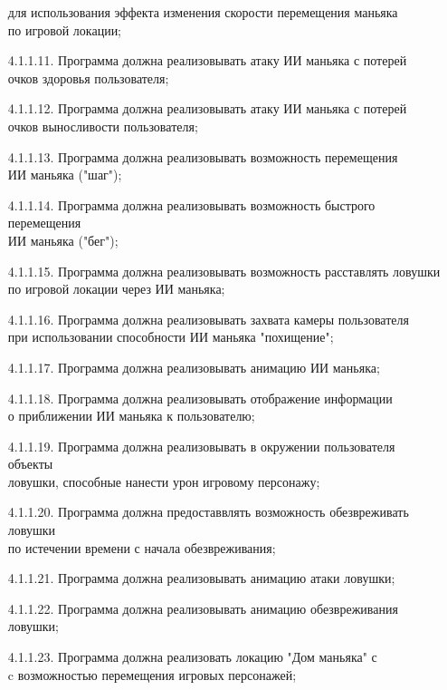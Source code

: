\begin{enumerate}
    для использования эффекта изменения скорости перемещения маньяка \\по игровой локации;
    \item[4.1.1.11.] Программа должна реализовывать атаку ИИ маньяка с потерей\\
    очков здоровья пользователя;
    \item[4.1.1.12.] Программа должна реализовывать атаку ИИ маньяка с потерей\\ 
    очков выносливости пользователя;
    \item[4.1.1.13.] Программа должна реализовывать возможность перемещения\\
    ИИ маньяка ("шаг");
    \item[4.1.1.14.] Программа должна реализовывать возможность быстрого перемещения\\
    ИИ маньяка ("бег");
    \item[4.1.1.15.] Программа должна реализовывать возможность расставлять ловушки\\
    по игровой локации через ИИ маньяка;
    \item[4.1.1.16.] Программа должна реализовывать захвата камеры пользователя\\
    при использовании способности ИИ маньяка "похищение";
    \item[4.1.1.17.] Программа должна реализовывать анимацию ИИ маньяка;
    \item[4.1.1.18.] Программа должна реализовывать отображение информации\\
    о приближении ИИ маньяка к пользователю;
    \item[4.1.1.19.] Программа должна реализовывать в окружении пользователя объекты\\
    ловушки, способные нанести урон игровому персонажу;
    \item[4.1.1.20.] Программа должна предоставвлять возможность обезвреживать ловушки\\
    по истечении времени с начала обезвреживания;
    \item[4.1.1.21.] Программа должна реализовывать анимацию атаки ловушки;
    \item[4.1.1.22.] Программа должна реализовывать анимацию обезвреживания ловушки;
    \item[4.1.1.23.] Программа должна реализовать локацию "Дом маньяка" с\\
    c возможностью перемещения игровых персонажей;
\end{enumerate}

